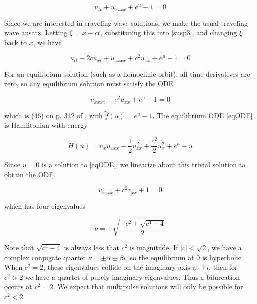 \documentclass[12pt]{article}
\begin{document}
\begin{equation}\label{susp3}
u_{tt} + u_{xxxx} + e^{u} - 1 = 0
\end{equation}

Since we are interested in traveling wave solutions, we make the usual traveling wave ansatz. Letting $\xi = x - ct$, substituting this into \eqref{susp3}, and changing $\xi$ back to $x$, we have

\begin{equation}\label{susp3}
u_{tt} - 2 c u_{x t} + u_{xxxx} + c^2 u_{xx} + e^{u} - 1 = 0
\end{equation}

For an equilibrium solution (such as a homoclinic orbit), all time derivatives are zero, so any equilibrium solution must satisfy the ODE

\begin{equation}\label{eqODE}
u_{xxxx} + c^2 u_{xx} + e^{u} - 1 = 0
\end{equation}

which is (46) on p. 342 of \cite{Chen1997}, with $\tilde{f}(u) = e^u - 1$. The equilibrium ODE \eqref{eqODE} is Hamiltonian with energy

\begin{equation}\label{eqH}
H(u) = u_x u_{xxx} - \frac{1}{2}u_{xx}^2 + \frac{c^2}{2}u_x^2 + e^u - u
\end{equation}

Since $u = 0$ is a solution to \eqref{eqODE}, we linearize about this trivial solution to obtain the ODE

\begin{equation}\label{lineartrivial}
v_{xxxx} + c^2 v_{xx} + 1 = 0
\end{equation}

which has four eigenvalues

\begin{equation}
\nu = \pm \sqrt{\frac{-c^2 \pm \sqrt{c^4 - 4}}{2} }
\end{equation}

Note that $\sqrt{c^4 - 4}$ is always less that $c^2$ is magnitude. If $|c| < \sqrt{2}$, we have a complex conjugate quartet $\nu = \pm \alpha \pm \beta i$, so the equilibrium at 0 is hyperbolic. When $c^2 = 2$, these eigenvalues collide on the imaginary axis at $\pm i$, then for $c^2 > 2$ we have a quartet of purely imaginary eigenvalues. Thus a bifurcation occurs at $c^2 = 2$. We expect that multipulse solutions will only be possible for $c^2 < 2$.\\
\end{document}
